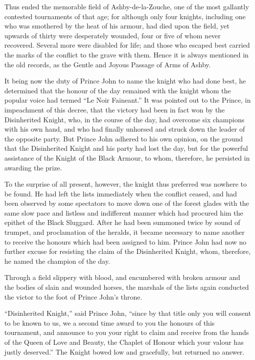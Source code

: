 Thus ended the memorable field of Ashby-de-la-Zouche, one of the most
gallantly contested tournaments of that age; for although only four
knights, including one who was smothered by the heat of his armour, had
died upon the field, yet upwards of thirty were desperately wounded,
four or five of whom never recovered. Several more were disabled for
life; and those who escaped best carried the marks of the conflict to
the grave with them. Hence it is always mentioned in the old records, as
the Gentle and Joyous Passage of Arms of Ashby.

It being now the duty of Prince John to name the knight who had done
best, he determined that the honour of the day remained with the knight
whom the popular voice had termed ``Le Noir Faineant.'' It was pointed
out to the Prince, in impeachment of this decree, that the victory had
been in fact won by the Disinherited Knight, who, in the course of the
day, had overcome six champions with his own hand, and who had finally
unhorsed and struck down the leader of the opposite party. But Prince
John adhered to his own opinion, on the ground that the Disinherited
Knight and his party had lost the day, but for the powerful assistance
of the Knight of the Black Armour, to whom, therefore, he persisted in
awarding the prize.

To the surprise of all present, however, the knight thus preferred was
nowhere to be found. He had left the lists immediately when the conflict
ceased, and had been observed by some spectators to move down one of the
forest glades with the same slow pace and listless and indifferent
manner which had procured him the epithet of the Black Sluggard. After
he had been summoned twice by sound of trumpet, and proclamation of the
heralds, it became necessary to name another to receive the honours
which had been assigned to him. Prince John had now no further excuse
for resisting the claim of the Disinherited Knight, whom, therefore, he
named the champion of the day.

Through a field slippery with blood, and encumbered with broken armour
and the bodies of slain and wounded horses, the marshals of the lists
again conducted the victor to the foot of Prince John's throne.

``Disinherited Knight,'' said Prince John, ``since by that title only
you will consent to be known to us, we a second time award to you the
honours of this tournament, and announce to you your right to claim and
receive from the hands of the Queen of Love and Beauty, the Chaplet of
Honour which your valour has justly deserved.'' The Knight bowed low and
gracefully, but returned no answer.

